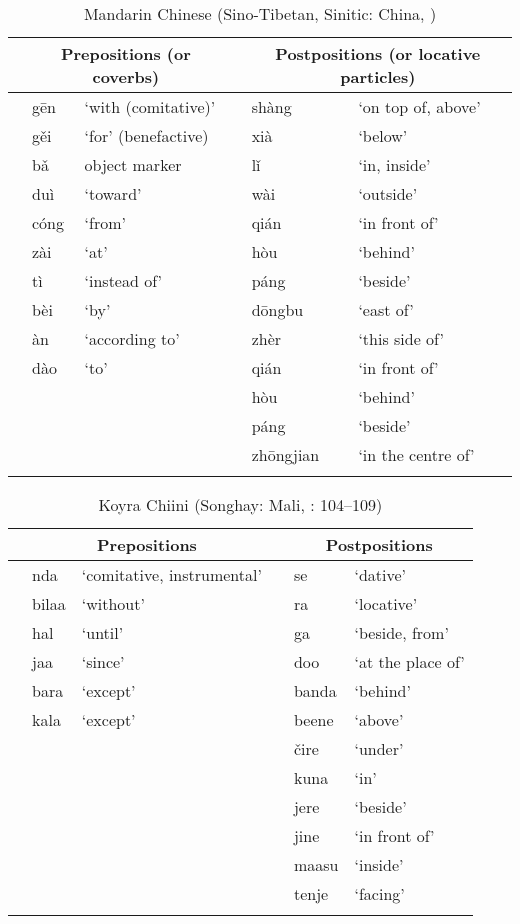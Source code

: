 \documentclass[output=paper]{langsci/langscibook}
\begin{document}
\begin{table}
\caption{Mandarin Chinese (Sino-Tibetan, Sinitic: China, \citealt{LiThompson1981})}
\label{extab:dryer:26} 
\begin{tabularx}{\textwidth}{lll lll} 
\lsptoprule
& \multicolumn{2}{c}{\bfseries Prepositions (or coverbs)} &  & \multicolumn{2}{c}{\bfseries Postpositions (or locative particles)}\\
\midrule
 & gēn & ‘with (comitative)’ &  & shàng & ‘on top of, above’\\
 & gěi & ‘for’ (benefactive) &  & xià & ‘below’\\
 & bǎ & object marker &  & lǐ & ‘in, inside’\\
 & duì & ‘toward’ &  & wài & ‘outside’\\
 & cóng & ‘from’ &  & qián & ‘in front of’\\
 & zài & ‘at’ &  & hòu & ‘behind’\\
 & tì & ‘instead of’ &  & páng & ‘beside’\\
 & bèi & ‘by’ &  & dōngbu & ‘east of’\\
 & àn & ‘according to’ &  & zhèr & ‘this side of’\\
 & dào & ‘to’ &  & qián & ‘in front of’\\
 &  &  &  & hòu & ‘behind’\\
 &  &  &  & páng & ‘beside’\\
 &  &  &  & zhōngjian & ‘in the centre of’\\
\lspbottomrule
\end{tabularx}
\end{table}

\begin{table}
\caption{Koyra Chiini (Songhay: Mali, \citealt{Heath1999}: 104–109)}
\label{extab:dryer:27}
\begin{tabularx}{\textwidth}{lll lll}
\lsptoprule
  & \multicolumn{2}{c}{\bfseries Prepositions} &  & \multicolumn{2}{c}{\bfseries Postpositions}\\
\midrule
 & nda & ‘comitative, instrumental’ &  & se & ‘dative’\\
 & bilaa & ‘without’ &  & ra & ‘locative’\\
 & hal & ‘until’ &  & ga & ‘beside, from’\\
 & jaa & ‘since’ &  & doo & ‘at the place of’\\
 & bara & ‘except’ &  & banda & ‘behind’\\
 & kala & ‘except’ &  & beene & ‘above’\\
 &  &  &  & čire & ‘under’\\
 &  &  &  & kuna & ‘in’\\
 &  &  &  & jere & ‘beside’\\
 &  &  &  & jine & ‘in front of’\\
 &  &  &  & maasu & ‘inside’\\
 &  &  &  & tenje & ‘facing’\\
\lspbottomrule
\end{tabularx}
\end{table}
\end{document}

